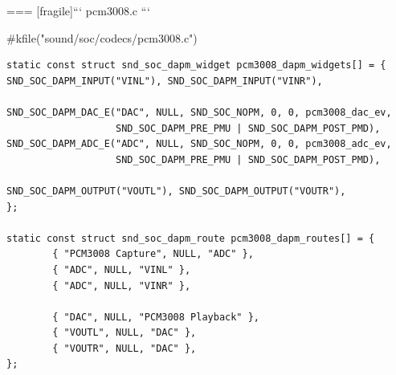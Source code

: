 === [fragile]{``` pcm3008.c ```}
  \begin{block}{#kfile("sound/soc/codecs/pcm3008.c")}
    \fontsize{9}{9}\selectfont
    \begin{verbatim}
static const struct snd_soc_dapm_widget pcm3008_dapm_widgets[] = {
SND_SOC_DAPM_INPUT("VINL"), SND_SOC_DAPM_INPUT("VINR"),

SND_SOC_DAPM_DAC_E("DAC", NULL, SND_SOC_NOPM, 0, 0, pcm3008_dac_ev,
                   SND_SOC_DAPM_PRE_PMU | SND_SOC_DAPM_POST_PMD), SND_SOC_DAPM_ADC_E("ADC", NULL, SND_SOC_NOPM, 0, 0, pcm3008_adc_ev,
                   SND_SOC_DAPM_PRE_PMU | SND_SOC_DAPM_POST_PMD),

SND_SOC_DAPM_OUTPUT("VOUTL"), SND_SOC_DAPM_OUTPUT("VOUTR"),
};

static const struct snd_soc_dapm_route pcm3008_dapm_routes[] = {
        { "PCM3008 Capture", NULL, "ADC" },
        { "ADC", NULL, "VINL" },
        { "ADC", NULL, "VINR" },

        { "DAC", NULL, "PCM3008 Playback" },
        { "VOUTL", NULL, "DAC" },
        { "VOUTR", NULL, "DAC" },
};
    \end{verbatim}
  \end{block}


